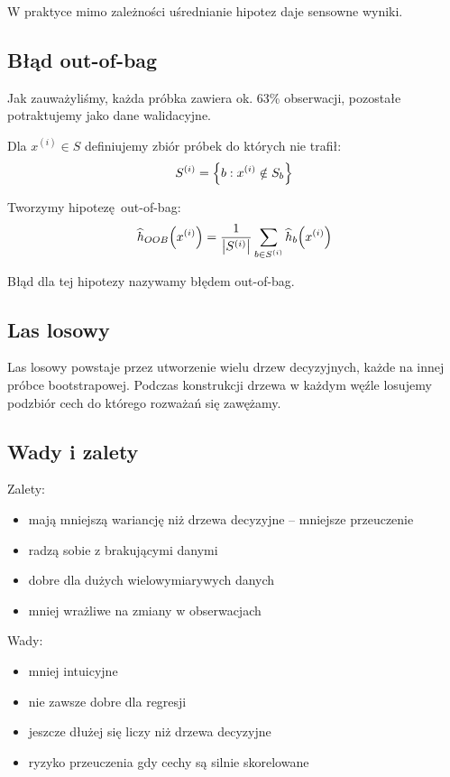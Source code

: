 W praktyce mimo zależności uśrednianie hipotez daje sensowne wyniki.

\subsection{Błąd out-of-bag}

Jak zauważyliśmy, każda próbka zawiera ok. 63\% obserwacji, pozostałe potraktujemy jako dane walidacyjne.

Dla \( x^{(i)} \in S \) definiujemy zbiór próbek do których nie trafił:
\[
	S^{(i)} = \set{b : x^{(i)} \notin S_b}
\]

Tworzymy hipotezę out-of-bag:
\[
	\widehat h_{OOB}\pars{x^{(i)}} = \frac{1}{\card{S^{(i)}}} \sum_{b \in S^{(i)}} \widehat h_b\pars{x^{(i)}}
\]

Błąd dla tej hipotezy nazywamy błędem out-of-bag.

\subsection{Las losowy}
Las losowy powstaje przez utworzenie wielu drzew decyzyjnych, każde na innej próbce bootstrapowej.
Podczas konstrukcji drzewa w każdym węźle losujemy podzbiór cech do którego rozważań się zawężamy.


\subsection{Wady i zalety}

Zalety:
\begin{itemize}
	\item mają mniejszą wariancję niż drzewa decyzyjne -- mniejsze przeuczenie
	\item radzą sobie z brakującymi danymi
	\item dobre dla dużych wielowymiarywych danych
	\item mniej wrażliwe na zmiany w obserwacjach
\end{itemize}

Wady:
\begin{itemize}
	\item mniej intuicyjne
	\item nie zawsze dobre dla regresji
	\item jeszcze dłużej się liczy niż drzewa decyzyjne
	\item ryzyko przeuczenia gdy cechy są silnie skorelowane
\end{itemize}